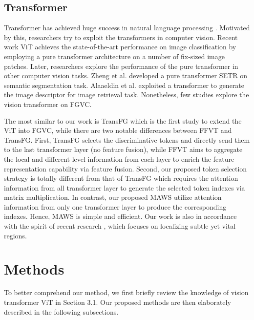 \documentclass{bmvc2k}
\begin{document}
\subsection{Transformer}
Transformer has achieved huge success in natural language processing \cite{devlin2018bert,tsai2019multimodal,vaswani2017attention}. Motivated by this, researchers try to exploit the transformers in computer vision. Recent work ViT \cite{dosovitskiy2020image} achieves the state-of-the-art performance on image classification by employing a pure transformer architecture on a number of fix-sized image patches. Later, researchers explore the performance of the pure transformer in other computer vision tasks. Zheng \cite{zheng2021rethinking} et al. developed a pure transformer SETR on semantic segmentation task. Alaaeldin et al. \cite{el2021training} exploited a transformer to generate the image descriptor for image retrieval task. Nonetheless, few studies explore the vision transformer on FGVC. \par 
The most similar to our work is TransFG \cite{he2021transfg} which is the first study to extend the ViT into FGVC, while there are two notable differences between FFVT and TransFG. First, TransFG selects the discriminative tokens and directly send them to the last transformer layer (no feature fusion), while FFVT aims to aggregate the local and different level information from each layer to enrich the feature representation capability via feature fusion. Second, our proposed token selection strategy is totally different from that of TransFG which requires the attention information from all transformer layer to generate the selected token indexes via matrix multiplication. In contrast, our proposed MAWS utilize attention information from only one transformer layer to produce the corresponding indexes. Hence, MAWS is simple and efficient. Our work is also in accordance with the spirit of recent research \cite{YUICCV21,YU2021108067,wang2021two, ZHAO2021107938,yu2020patchy,wang2021boosted,zhao2022learning,yu2019multiscale,yu2015leaf,yu2016multiscale,9506424, wang2021ear,zhang2009local,gao2002face}, which focuses on localizing subtle yet vital regions.

\section{Methods}
To better comprehend our method, we first briefly review the knowledge of vision transformer ViT in Section 3.1. Our proposed methods are then elaborately described in the following subsections.
\par
\end{document}
